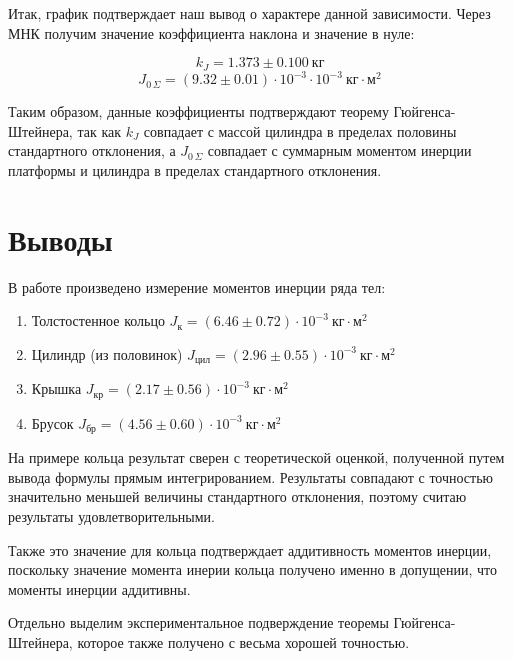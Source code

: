 \documentclass[12pt,a4paper]{scrartcl}
\begin{document}
	Итак, график подтверждает наш вывод о характере данной зависимости. Через МНК получим значение коэффициента наклона и значение в нуле:
	
	$$k_J = 1.373 \pm 0.100\ \text{кг}$$
	$$J_{0\,\Sigma} = (9.32 \pm 0.01) \cdot 10^{-3} \cdot 10^{-3}\ \text{кг}\cdot\text{м}^2$$
	
	Таким образом, данные коэффициенты подтверждают теорему Гюйгенса-Штейнера, так как $k_J$ совпадает с массой цилиндра в пределах половины стандартного отклонения, а $J_{0\,\Sigma}$ совпадает с суммарным моментом инерции платформы и цилиндра в пределах стандартного отклонения.
	
	\section{Выводы}
	В работе произведено измерение моментов инерции ряда тел:
	\begin{enumerate}
		\item Толстостенное кольцо $J_{\text{к}} = (6.46 \pm 0.72) \cdot 10^{-3}\ \text{кг}\cdot\text{м}^2$
		
		\item Цилиндр (из половинок) $J_{\text{цил}} = (2.96 \pm 0.55) \cdot 10^{-3}\ \text{кг}\cdot\text{м}^2$
		
		\item Крышка $J_{\text{кр}} = (2.17 \pm 0.56) \cdot 10^{-3}\ \text{кг}\cdot\text{м}^2$
		
		\item Брусок $J_{\text{бр}} = (4.56 \pm 0.60) \cdot 10^{-3}\ \text{кг}\cdot\text{м}^2$
	\end{enumerate}
	
	На примере кольца результат сверен с теоретической оценкой, полученной путем вывода формулы прямым интегрированием. Результаты совпадают с точностью значительно меньшей величины стандартного отклонения, поэтому считаю результаты удовлетворительными.
	
	Также это значение для кольца подтверждает аддитивность моментов инерции, поскольку значение момента инерии кольца получено именно в допущении, что моменты инерции аддитивны.
	
	Отдельно выделим экспериментальное подверждение теоремы Гюйгенса-Штейнера, которое также получено с весьма хорошей точностью.
	
\end{document}
